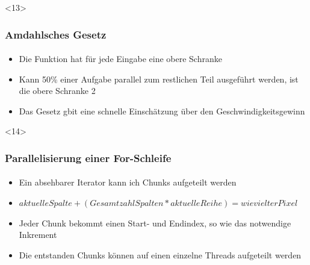 \documentclass{beamer}
\begin{document}
\begin{frame}<13>
  \frametitle{Amdahlsches Gesetz}
  \framesubtitle{}

    \begin{itemize}
    \item  Die Funktion hat für jede Eingabe eine obere Schranke
    \item  Kann 50\% einer Aufgabe parallel zum restlichen Teil ausgeführt werden, ist die obere Schranke 2
    \item  Das Gesetz gbit eine schnelle Einschätzung über den Geschwindigkeitsgewinn
  \end{itemize}
  
\end{frame}

\begin{frame}<14>
  \frametitle{Parallelisierung einer For-Schleife}
  \framesubtitle{}
  
  \begin{itemize}
    \item  Ein absehbarer Iterator kann ich Chunks aufgeteilt werden
    \item  $aktuelle Spalte+(Gesamtzahl Spalten*aktuelle Reihe) = wievielter Pixel$
    \item  Jeder Chunk bekommt einen Start- und Endindex, so wie das notwendige Inkrement 
    \item  Die entstanden Chunks können auf einen einzelne Threads aufgeteilt werden
  \end{itemize}

\end{frame}
\end{document}
